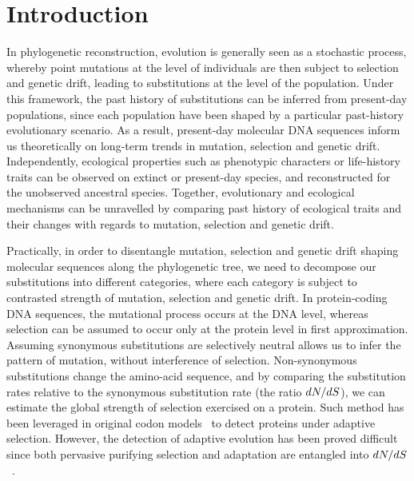 \section{Introduction}
\label{sec:Introduction}

In phylogenetic reconstruction, evolution is generally seen as a stochastic process, whereby point mutations at the level of individuals are then subject to selection and genetic drift, leading to substitutions at the level of the population.
Under this framework, the past history of substitutions can be inferred from present-day populations, since each population have been shaped by a particular past-history evolutionary scenario.
As a result, present-day molecular \acrshort{DNA} sequences inform us theoretically on long-term trends in mutation, selection and genetic drift.
Independently, ecological properties such as phenotypic characters or life-history traits can be observed on extinct or present-day species, and reconstructed for the unobserved ancestral species.
Together, evolutionary and ecological mechanisms can be unravelled by comparing past history of ecological traits and their changes with regards to mutation, selection and genetic drift.

Practically, in order to disentangle mutation, selection and genetic drift shaping molecular sequences along the phylogenetic tree, we need to decompose our substitutions into different categories, where each category is subject to contrasted strength of mutation, selection and genetic drift.
In protein-coding \acrshort{DNA} sequences, the mutational process occurs at the \acrshort{DNA} level, whereas selection can be assumed to occur only at the protein level in first approximation.
Assuming synonymous substitutions are selectively neutral allows us to infer the pattern of mutation, without interference of selection.
Non-synonymous substitutions change the amino-acid sequence, and by comparing the substitution rates relative to the synonymous substitution rate (the ratio $dN/dS$), we can estimate the global strength of selection exercised on a protein.
Such method has been leveraged in original codon models~\citep{Muse1994,Goldman1994} to detect proteins under adaptive selection.
However, the detection of adaptive evolution has been proved difficult since both pervasive purifying selection and adaptation are entangled into $dN/dS$~\citep{Yang2000}.

